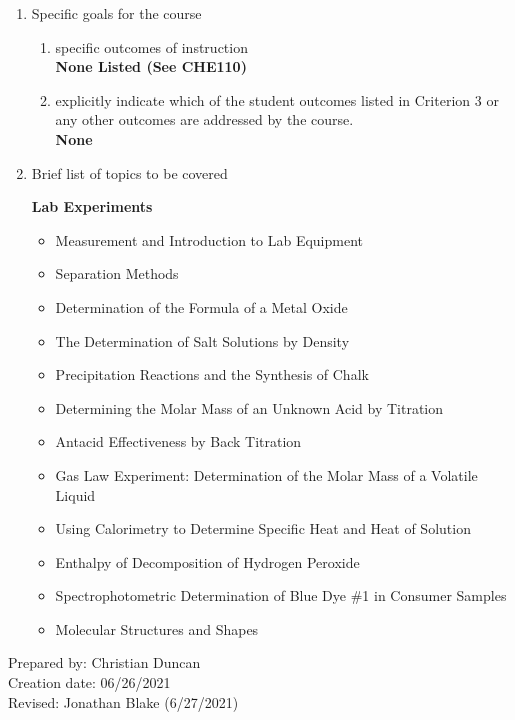\begin{enumerate}[1.]
\begin{enumerate}[a.]
\end{enumerate}

\item Specific goals for the course
\begin{enumerate}
\item specific outcomes of instruction\\ %
  {\bfseries
    None Listed (See CHE110)
  }

\item explicitly indicate which of the student outcomes listed in Criterion 3 or any other outcomes are addressed by the course.\\
  {\bfseries
    None
  }
\end{enumerate}

\item Brief list of topics to be covered\\
  {\bfseries
    Lab Experiments
    \begin{itemize}
      \item Measurement and Introduction to Lab Equipment
      \item Separation Methods
      \item Determination of the Formula of a Metal Oxide
      \item The Determination of Salt Solutions by Density
      \item Precipitation Reactions and the Synthesis of Chalk
      \item Determining the Molar Mass of an Unknown Acid by Titration
      \item Antacid Effectiveness by Back Titration
      \item Gas Law Experiment: Determination of the Molar Mass of a Volatile Liquid
      \item Using Calorimetry to Determine Specific Heat and Heat of Solution
      \item Enthalpy of Decomposition of Hydrogen Peroxide
      \item Spectrophotometric Determination of Blue Dye \#1 in Consumer Samples
      \item Molecular Structures and Shapes
    \end{itemize}
  }

\end{enumerate}

\noindent Prepared by: Christian Duncan\\
\noindent Creation date: 06/26/2021\\
\noindent Revised: Jonathan Blake (6/27/2021)\\

